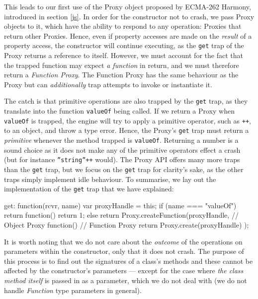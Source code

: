 This leads to our first use of the Proxy object proposed by ECMA-262 Harmony, introduced in section \ref{js}. In order for the constructor not to crash, we pass Proxy objects to it, which have the ability to respond to any operation: Proxies that return other Proxies. Hence, even if property accesses are made on the \emph{result} of a property access, the constructor will continue executing, as the \texttt{get} trap of the Proxy returns a reference to itself. However, we must account for the fact that the trapped function may expect \emph{a function} in return, and we must therefore return a \emph{Function Proxy}. The Function Proxy has the same behaviour as the Proxy but can \emph{additionally} trap attempts to invoke or instantiate it.

The catch is that primitive operations are also trapped by the \texttt{get} trap, as they translate into the function \texttt{valueOf} being called. If we return a Proxy when \texttt{valueOf} is trapped, the engine will try to apply a primitive operator, such as \texttt{++}, to an object, and throw a type error. Hence, the Proxy's \texttt{get} trap must return a \emph{primitive} whenever the method trapped is \texttt{valueOf}. Returning a number is a sound choice as it does not make any of the primitive operators effect a crash (but for instance \texttt{''string''++} would). The Proxy API offers many more traps than the \texttt{get} trap, but we focus on the \texttt{get} trap for clarity's sake, as the other traps simply implement idle behaviour. To summarise, we lay out the implementation of the \texttt{get} trap that we have explained:

\begin{code}[caption=\textsf{Analyser} Proxy's \texttt{get} trap,label=gettrap]
get: function(rcvr, name) {
    var proxyHandle = this;
    if (name === "valueOf") {
        return function() {
            return 1;
        }
    }
    else {
        return Proxy.createFunction(proxyHandle, // Object Proxy
                                    function() { // Function Proxy
                                        return Proxy.create(proxyHandle)
                                    });
    }
}   
\end{code}

It is worth noting that we do not care about the \emph{outcome} of the operations on parameters within the constructor, only that it does not crash. The purpose of this process is to find out the signatures of a class's methods and these cannot be affected by the constructor's parameters --- except for the case where \emph{the class method itself} is passed in as a parameter, which we do not deal with (we do not handle \textit{Function} type parameters in general).

